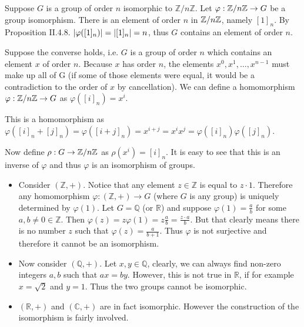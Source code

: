 \begin{solution}
	Suppose $G$ is a group of order $n$ isomorphic to $\mathbb{Z}/n\mathbb{Z}$. Let $\varphi: \mathbb{Z}/n\mathbb{Z} \to G$ be a group isomorphism. There is an element of order $n$ in $\mathbb{Z}/n\mathbb{Z}$, namely $[1]_n$. By Proposition II.4.8. $\left|\varphi([1]_n)\right|=\left|[1]_n\right|=n$, thus $G$ contains an element of order $n$.
	
	Suppose the converse holds, i.e. $G$ is a group of order $n$ which contains an element $x$ of 
	order $n$. Because $x$ has order $n$, the elements $x^0, x^1, \dots, x^{n-1}$ must make up all of G (if some of those elements were equal, it would be a contradiction to the order of $x$ by cancellation). We can define a homomorphism $\varphi: \mathbb{Z}/n\mathbb{Z} \to G$ as $\varphi([i]_n) = x^i$.
	
	This is a homomorphism as $\varphi([i]_n + [j]_n) = \varphi([i + j]_n) = x^{i + j} = x^i x^j = \varphi([i]_n) \varphi([j]_n)$.
	
	Now define $\rho: G \to \mathbb{Z}/n\mathbb{Z}$ as $\rho(x^i) = [i]_n$. It is easy to see that this is an inverse of $\varphi$ and thus $\varphi$ is an isomorphism of groups.
\end{solution}

\begin{problem}
\end{problem}

\begin{solution}
	\begin{itemize}
		We will consider the groups one by one:
		
		\item Consider $(\mathbb{Z}, +)$. Notice that any element $z \in \mathbb{Z}$ is equal to $z \cdot 1$. Therefore any homomorphism $\varphi: (\mathbb{Z}, +) \to G$ (where $G$ is any group) is uniquely determined by $\varphi(1)$. Let $G = \mathbb{Q}$ (or $\mathbb{R}$) and suppose $\varphi(1) = \frac{a}{b}$ for some $a, b \neq 0 \in \mathbb{Z}$. Then $\varphi(z) = z \varphi(1) = z \frac{a}{b} = \frac{z \cdot a}{b}$. But that clearly means there is no number $z$ such that $\varphi(z) = \frac{a}{b+1}$. Thus $\varphi$ is not surjective and therefore it cannot be an isomorphism.
		
		\item Now consider $(\mathbb{Q}, +)$. Let $x, y \in \mathbb{Q}$, clearly, we can always find non-zero integers $a, b$ such that $a x = b y$. However, this is not true in $\mathbb{R}$, if for example $x = \sqrt{2}$ and $y = 1$. Thus the two groups cannot be isomorphic.
		
		\item $(\mathbb{R}, +)$ and $(\mathbb{C}, +)$ are in fact isomorphic. However the construction of the isomorphism is fairly involved. \qedhere
	\end{itemize}
\end{solution}

